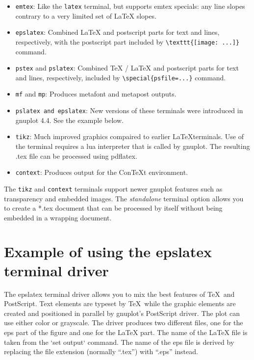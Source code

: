 \begin{itemize}
\item \texttt{emtex}: Like the \texttt{latex} terminal, but supports emtex
specials: any line slopes contrary to a very limited set of \LaTeX{} slopes.

\item \texttt{epslatex}: Combined \LaTeX{} and postscript parts for text and
lines, respectively, with the postscript part included by
\verb+\texttt{[image: ...]}+ command.

\item \texttt{pstex} and \texttt{pslatex}: Combined \TeX{} / \LaTeX{} and 
postscript parts for text and lines, respectively, included by
\verb+\special{psfile=...}+ command.

\item \texttt{mf} and \texttt{mp}: Produces metafont and metapost outputs.

\item \texttt{pslatex and epslatex}:  New versions of these terminals were
introduced in gnuplot 4.4.  See the example below. 

\item \texttt{tikz}:  Much improved graphics compaired to earlier \LaTeX terminals.  
Use of the terminal requires a lua interpreter that is called by gnuplot. 
The resulting .tex file can be processed using pdflatex.

\item \texttt{context}:  Produces output for the {Con{\TeX}t} environment.

\end{itemize}

The {\tt tikz} and {\tt context} terminals support newer gnuplot features
such as transparency and embedded images.  The {\em standalone} terminal
option allows you to create a *.tex document that can be processed by itself
without being embedded in a wrapping document.

\section{Example of using the epslatex terminal driver}
\label{epslatex}

The epslatex terminal driver allows you to mix the best features of \TeX\
and PostScript. Text elements are typeset by \TeX\, while the graphic
elements are created and positioned in parallel by gnuplot's PostScript
driver. The plot can use either color or grayscale.
The driver produces two different files, one for the eps part of the figure
and one for the \LaTeX{} part. The name of the \LaTeX{} file is taken from the
`set output` command. The name of the eps file is derived by replacing
the file extension (normally ``.tex'') with ``.eps'' instead.  


